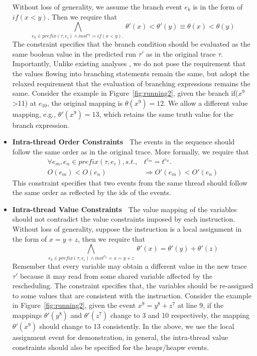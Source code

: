 \begin{itemize}
Without loss of generality, we assume the branch event $e_k$ is in the form of $if(x<y)$. Then  we require that 
$$
\bigwedge_{e_k \in prefix(\tau,e_i) \wedge  inst^{e_k}=if(x<y).\ }  \theta'(x)<\theta'(y) 	\equiv \theta(x)<\theta(y)
$$ 
The constraint specifies that the branch condition should be evaluated as the same boolean value in the predicted run $\tau'$ as in the original trace $\tau$.
 Importantly, Unlike existing analyses \cite{yannis,pldi14}, we do not pose the requirement that the values flowing into branching statements remain the same, but adopt the relaxed requirement that the evaluation of branching expressions remains the same. Consider the example in Figure~\ref{fig:running2}, given the branch if($x^9$>11) at $e_10$, the original mapping is $\theta(x^9)=12$. We allow  a different value mapping, e.g., $\theta'(x^9)=13$, which retains the same truth value for the branch expression.
\item {\bf Intra-thread Order Constraints\ } The events in the sequence should follow the same order as in the original trace. More formally, we require that
$$
\begin{array}{rl}
\forall e_m, e_n \in prefix(\tau,e_i), s.t., & t^{e_m} = t^{e_n}. \\
 O(e_m) < O(e_n)\  & \Rightarrow O'(e_{m}) < O'(e_{n}) 
\end{array}
$$ 
This constraint specifies that two events from the same thread should follow the same order as reflected by the ids of the events.
\item {\bf Intra-thread Value Constraints\ } The value mapping of the variables should not contradict the value constraints imposed by each instruction.   Without loss of generality, suppose the instruction is a local assignment in the form of $x=y+z$, then we require that
$$
\bigwedge_{e_k \in prefix(\tau,e_i) \wedge inst^{e_k}=x=y+z}\
	\theta'(x)=\theta'(y)+\theta'(z)
$$
Remember that every variable may obtain a different value in the new trace $\tau'$ because it may read from some shared variable affected by the rescheduling.
The constraint specifies that, the variables should be re-assigned to some values that are consistent with the instruction. Consider the example in Figure~\ref{fig:running2}, given the event $x^9=y^8+z^7$ at line 9, if the mappings $\theta'(y^8)$ and $\theta'(z^7)$ change to 3 and 10 respectively, the mapping $\theta'(x^9)$ should change to 13 consistently. In the above, we use the local assignment event for demonstration, in general, the intra-thread value constraints should also be specified for the {\sf  heapr/heapw} events.
\end{itemize}



